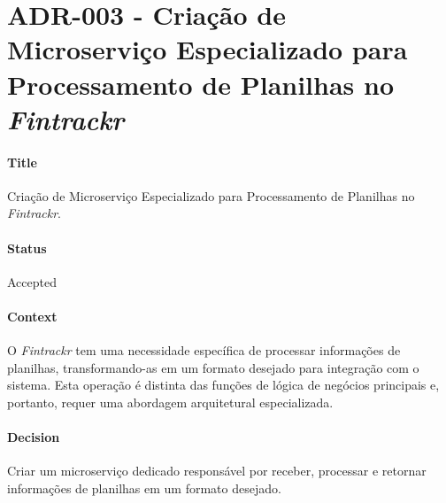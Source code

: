 
\chapter{ADR-003 - Criação de Microserviço Especializado para Processamento de Planilhas no \textit{Fintrackr}}
\label{apendiceADR003}

\subsubsection*{Title}
Criação de Microserviço Especializado para Processamento de Planilhas no \textit{Fintrackr}.

\subsubsection*{Status}
Accepted

\subsubsection*{Context}
O \textit{Fintrackr} tem uma necessidade específica de processar informações de planilhas, transformando-as em um formato desejado para integração com o sistema. Esta operação é distinta das funções de lógica de negócios principais e, portanto, requer uma abordagem arquitetural especializada.

\subsubsection*{Decision}
Criar um microserviço dedicado responsável por receber, processar e retornar informações de planilhas em um formato desejado.

